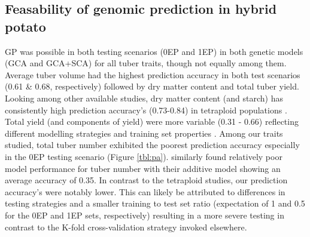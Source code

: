 \subsection{Feasability of genomic prediction in hybrid potato}

GP was possible in both testing scenarios (0EP and 1EP) in both genetic models (GCA and GCA+SCA) for all tuber traits, though not equally among them. Average tuber volume had the highest prediction accuracy in both test scenarios (0.61 \& 0.68, respectively) followed by dry matter content and total tuber yield. Looking among other available studies, dry matter content (and starch) has consistently high prediction accuracy's (0.73-0.84) in tetraploid populations \cite{Sverrisdottir2018, Cuevas2022, Ortiz2022}. Total yield (and components of yield) were more variable (0.31 - 0.66) reflecting different modelling strategies and training set properties \citep{Ortiz2022, Wilson2021}. Among our traits studied, total tuber number exhibited the poorest prediction accuracy especially in the 0EP testing scenario (Figure \ref{tbl:pa}). \citep{Wilson2021} similarly found relatively poor model performance for tuber number with their additive model showing an average accuracy of 0.35. In contrast to the tetraploid studies, our prediction accuracy's were notably lower. This can likely be attributed to differences in testing strategies and a smaller training to test set ratio (expectation of 1 and 0.5 for the 0EP and 1EP sets, respectively) resulting in a more severe testing in contrast to the K-fold cross-validation strategy invoked elsewhere.

